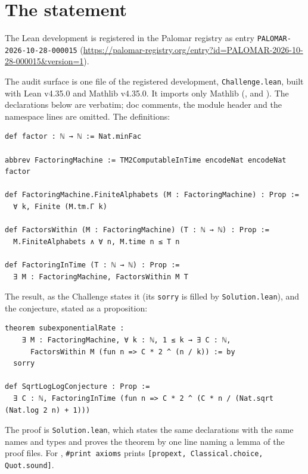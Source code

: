 \documentclass[11pt]{article}
\newcommand{\code}[1]{\texttt{#1}}
\begin{document}
\section{The statement}\label{sec:statement}

The Lean development is registered in the Palomar registry as entry
\code{PALOMAR-2026-10-28-000015}
(\url{https://palomar-registry.org/entry?id=PALOMAR-2026-10-28-000015&version=1}).

The audit surface is one file of the registered development, \code{Challenge.lean}, built with Lean v4.35.0 and
Mathlib v4.35.0. It imports only Mathlib
(,  and
). The declarations below are verbatim; doc comments, the module header and the
namespace lines are omitted. The definitions:
\begin{Verbatim}
def factor : ℕ → ℕ := Nat.minFac

abbrev FactoringMachine := TM2ComputableInTime encodeNat encodeNat factor

def FactoringMachine.FiniteAlphabets (M : FactoringMachine) : Prop :=
  ∀ k, Finite (M.tm.Γ k)

def FactorsWithin (M : FactoringMachine) (T : ℕ → ℕ) : Prop :=
  M.FiniteAlphabets ∧ ∀ n, M.time n ≤ T n

def FactoringInTime (T : ℕ → ℕ) : Prop :=
  ∃ M : FactoringMachine, FactorsWithin M T
\end{Verbatim}
The result, as the Challenge states it (its \code{sorry} is filled by \code{Solution.lean}), and the
conjecture, stated as a proposition:
\begin{Verbatim}
theorem subexponentialRate :
    ∃ M : FactoringMachine, ∀ k : ℕ, 1 ≤ k → ∃ C : ℕ,
      FactorsWithin M (fun n => C * 2 ^ (n / k)) := by
  sorry

def SqrtLogLogConjecture : Prop :=
  ∃ C : ℕ, FactoringInTime (fun n => C * 2 ^ (C * n / (Nat.sqrt (Nat.log 2 n) + 1)))
\end{Verbatim}
The proof is \code{Solution.lean}, which states the same declarations with the same names and types and
proves the theorem by one line naming a lemma of the proof files. For ,
\code{\#print axioms} prints \code{[propext, Classical.choice, Quot.sound]}.
\end{document}
